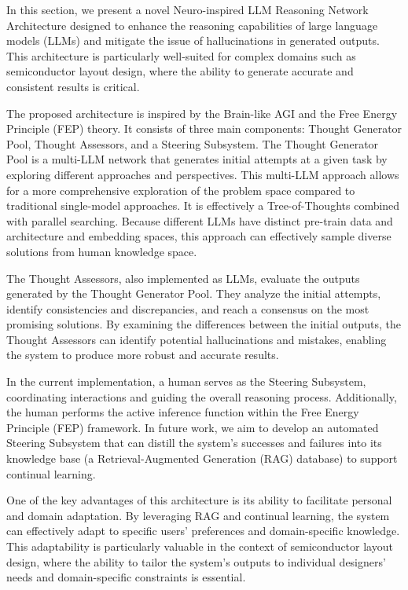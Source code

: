 \documentclass{article}
\begin{document}
In this section, we present a novel Neuro-inspired LLM Reasoning Network Architecture designed to enhance the reasoning capabilities of large language models (LLMs) and mitigate the issue of hallucinations in generated outputs. This architecture is particularly well-suited for complex domains such as semiconductor layout design, where the ability to generate accurate and consistent results is critical.

The proposed architecture is inspired by the Brain-like AGI and the Free Energy Principle (FEP) theory. It consists of three main components: Thought Generator Pool, Thought Assessors, and a Steering Subsystem. The Thought Generator Pool is a multi-LLM network that generates initial attempts at a given task by exploring different approaches and perspectives. This multi-LLM approach allows for a more comprehensive exploration of the problem space compared to traditional single-model approaches. It is effectively a Tree-of-Thoughts combined with parallel searching. Because different LLMs have distinct pre-train data and architecture and embedding spaces, this approach can effectively sample diverse solutions from human knowledge space.

The Thought Assessors, also implemented as LLMs, evaluate the outputs generated by the Thought Generator Pool. They analyze the initial attempts, identify consistencies and discrepancies, and reach a consensus on the most promising solutions. By examining the differences between the initial outputs, the Thought Assessors can identify potential hallucinations and mistakes, enabling the system to produce more robust and accurate results.

In the current implementation, a human serves as the Steering Subsystem, coordinating interactions and guiding the overall reasoning process. Additionally, the human performs the active inference function within the Free Energy Principle (FEP) framework. In future work, we aim to develop an automated Steering Subsystem that can distill the system's successes and failures into its knowledge base (a Retrieval-Augmented Generation (RAG) database) to support continual learning.

One of the key advantages of this architecture is its ability to facilitate personal and domain adaptation. By leveraging RAG and continual learning, the system can effectively adapt to specific users' preferences and domain-specific knowledge. This adaptability is particularly valuable in the context of semiconductor layout design, where the ability to tailor the system's outputs to individual designers' needs and domain-specific constraints is essential.
\end{document}
